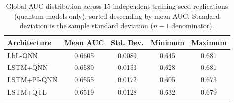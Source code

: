 \begin{table}[htbp]
\centering
\caption{Global AUC distribution across 15 independent training-seed replications (quantum models only), sorted descending by mean AUC. Standard deviation is the sample standard deviation ($n-1$ denominator).}
\label{tab:quantum_multiseed}
\begin{tabular}{lcccc}
\toprule
\textbf{Architecture} & \textbf{Mean AUC} & \textbf{Std. Dev.} & \textbf{Minimum} & \textbf{Maximum} \\
\midrule
LbL-QNN & 0.6605 & 0.0089 & 0.645 & 0.681 \\
LSTM+QNN & 0.6589 & 0.0153 & 0.628 & 0.681 \\
LSTM+PI-QNN & 0.6555 & 0.0172 & 0.605 & 0.673 \\
LSTM+QTL & 0.6519 & 0.0128 & 0.632 & 0.679 \\
\bottomrule
\end{tabular}
\end{table}